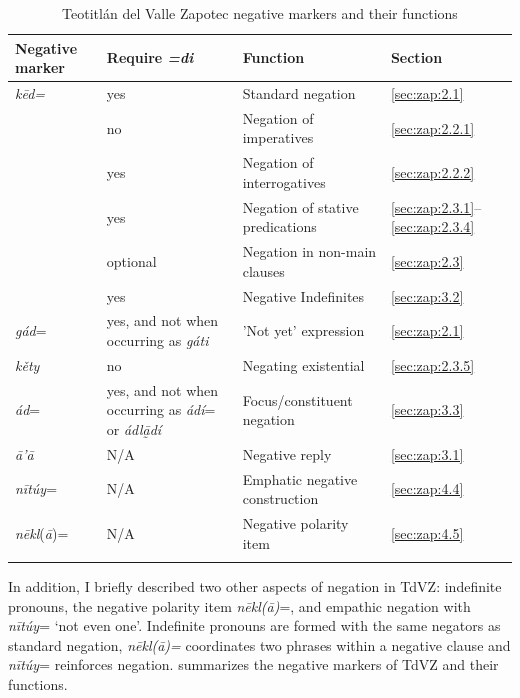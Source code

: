 \documentclass[output=paper,colorlinks=true, citecolor=brown]{langscibook}
\begin{document}
\begin{table}[b]
    \begin{tabularx}{\textwidth}{lQ@{~~~}ll}
\lsptoprule 
Negative marker& Require \textit{=di} & Function & Section\\
\midrule 

\textit{kēd= }
& yes 
& Standard negation & \ref{sec:zap:2.1}  \\

& no  
& Negation of imperatives & \ref{sec:zap:2.2.1} \\

& yes 
& Negation of interrogatives & \ref{sec:zap:2.2.2}  \\

& yes 
& Negation of stative predications & \ref{sec:zap:2.3.1}--\ref{sec:zap:2.3.4}  \\

& optional 
& Negation in non-main clauses & \ref{sec:zap:2.3}  \\

& yes 
& Negative Indefinites & \ref{sec:zap:3.2}  \\
\tablevspace
\textit{gád}= 
& yes, and not when occurring  as \textit{gáti}
& 'Not yet' expression & \ref{sec:zap:2.1}  \\
\tablevspace

\textit{kěty} 
& no 
& Negating existential & \ref{sec:zap:2.3.5}  \\
\tablevspace

\textit{ád}= 
& yes, and not when occurring as \textit{ádí}= or \textit{ádlā̰dí}
& Focus/constituent negation & \ref{sec:zap:3.3}  \\
\tablevspace

\textit{ā’ā}
& N/A 
& Negative reply & \ref{sec:zap:3.1}  \\
\tablevspace

\textit{nītúy}= 
& N/A 
& Emphatic negative construction & \ref{sec:zap:4.4}  \\
\tablevspace

\textit{nēkl}(\textit{ā})= 
& N/A 
& Negative polarity item & \ref{sec:zap:4.5} \\
\lspbottomrule
    \end{tabularx}
    \caption{Teotitlán del Valle Zapotec negative markers and their functions}
    \label{tab:zap:3}
\end{table}


In addition, I briefly described two other aspects of negation in TdVZ: indefinite pronouns, the negative polarity item \textit{nēkl(ā)}=, and empathic negation with \textit{nītúy}= ‘not even one’. Indefinite pronouns are formed with the same negators as standard negation, \textit{nēkl(ā)=} coordinates two phrases within a negative clause and \textit{nītúy}= reinforces negation.
 summarizes the negative markers of TdVZ and their functions.
\end{document}
